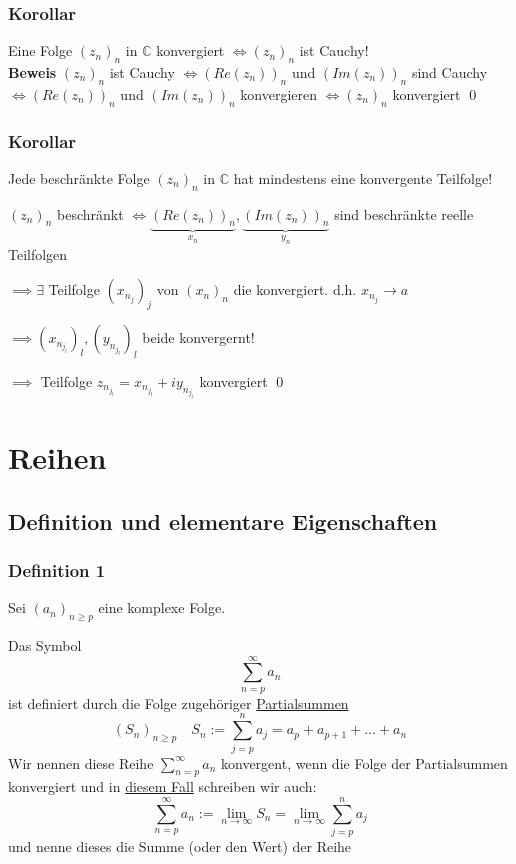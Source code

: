 \documentclass[fleqn]{scrbook}
\renewenvironment{proof}{{\bfseries Beweis }}{\qed}
\begin{document}
\subsection{Korollar}
Eine Folge $(z_n)_n$ in $\mathbb{C}$ konvergiert $\Leftrightarrow (z_n)_n$ ist Cauchy!\\
\begin{proof}
$(z_n)_n$ ist Cauchy $\Leftrightarrow (Re(z_n))_n$ und $(Im(z_n))_n$ sind Cauchy $\Leftrightarrow (Re(z_n))_n$ und $(Im(z_n))_n$ konvergieren $\Leftrightarrow (z_n)_n$ konvergiert
\end{proof}

\subsection{Korollar} Jede beschränkte Folge $(z_n)_n$ in $\mathbb{C}$ hat mindestens eine konvergente Teilfolge!

\begin{proof}
$(z_n)_n$ beschränkt $\Leftrightarrow \underbrace{(Re(z_n))_n}_{x_n}, \underbrace{(Im(z_n))_n}_{y_n}$ sind beschränkte reelle Teilfolgen

$\implies \exists$ Teilfolge $(x_{n_j})_j$ von $(x_n)_n$ die konvergiert. d.h. $x_{n_j} \rightarrow a$

$\implies (x_{n_{j_l}})_l, (y_{n_{j_l}})_l$ beide konvergernt!

$\implies$ Teilfolge $z_{n_{j_l}} = x_{n_{j_l}} + iy_{n_{j_l}}$ konvergiert
\end{proof}

\chapter{Reihen}
\section{Definition und elementare Eigenschaften}

\subsection{Definition 1}

Sei $(a_n)_{n\geq p}$ eine komplexe Folge.

Das Symbol 
\[\sum_{n=p}^\infty a_n\]
ist definiert durch die Folge zugehöriger \underline{Partialsummen}
\[(S_n)_{n \geq p} \quad S_n := \sum_{j=p}^n a_j = a_p +a_{p+1} + \ldots + a_n \]
Wir nennen diese Reihe $\sum_{n=p}^\infty a_n$ konvergent, wenn die Folge der Partialsummen konvergiert und in \underline{diesem Fall} schreiben wir auch:
\[\sum_{n=p}^\infty a_n := \lim_{n\to \infty} S_n = \lim_{n\to \infty} \sum_{j=p}^n a_j\]
und nenne dieses die Summe (oder den Wert) der Reihe
\end{document}

